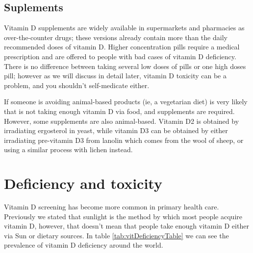 \subsection{Suplements}

Vitamin D supplements are widely available in supermarkets and pharmacies as over-the-counter drugs; these versions already contain more than the daily recommended doses of vitamin D. Higher concentration pills require a medical prescription and are offered to people with bad cases of vitamin D deficiency. There is no difference between taking several low doses of pills or one high doses pill; however as we will discuss in detail later, vitamin D toxicity can be a problem, and you shouldn't self-medicate either.\vspace{3 mm}

If someone is avoiding animal-based products (ie, a vegetarian diet) is very likely that is not taking enough vitamin D via food, and supplements are required. However, some supplements are also animal-based. Vitamin D2 is obtained by irradiating ergosterol in yeast, while vitamin D3 can be obtained by either irradiating pre-vitamin D3 from lanolin which comes from the wool of sheep, or using a similar process with lichen instead.\vspace{3 mm}


\section{Deficiency and toxicity}

Vitamin D screening has become more common in primary health care. Previously we stated that sunlight is the method by which most people acquire vitamin D, however, that doesn't mean that people take enough vitamin D either via Sun or dietary sources. In table \ref{tab:vitDeficiencyTable} we can see the prevalence of vitamin D deficiency around the world.\vspace{3 mm}


